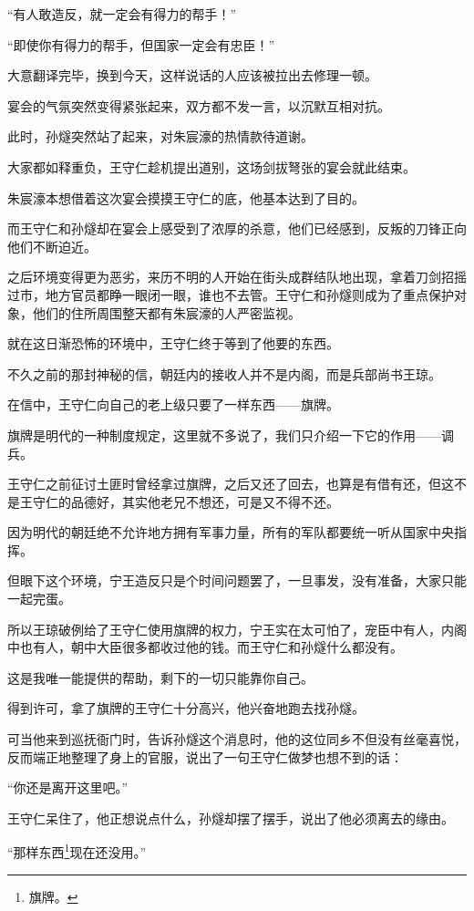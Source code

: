 \begin{multicols}{\theparacolNo}
		“有人敢造反，就一定会有得力的帮手！”

		“即使你有得力的帮手，但国家一定会有忠臣！”

		大意翻译完毕，换到今天，这样说话的人应该被拉出去修理一顿。

		宴会的气氛突然变得紧张起来，双方都不发一言，以沉默互相对抗。

		此时，孙燧突然站了起来，对朱宸濠的热情款待道谢。

		大家都如释重负，王守仁趁机提出道别，这场剑拔弩张的宴会就此结束。

		朱宸濠本想借着这次宴会摸摸王守仁的底，他基本达到了目的。

		而王守仁和孙燧却在宴会上感受到了浓厚的杀意，他们已经感到，反叛的刀锋正向他们不断迫近。

		之后环境变得更为恶劣，来历不明的人开始在街头成群结队地出现，拿着刀剑招摇过市，地方官员都睁一眼闭一眼，谁也不去管。王守仁和孙燧则成为了重点保护对象，他们的住所周围整天都有朱宸濠的人严密监视。

		就在这日渐恐怖的环境中，王守仁终于等到了他要的东西。

		不久之前的那封神秘的信，朝廷内的接收人并不是内阁，而是兵部尚书王琼。

		在信中，王守仁向自己的老上级只要了一样东西——旗牌。

		旗牌是明代的一种制度规定，这里就不多说了，我们只介绍一下它的作用——调兵。

		王守仁之前征讨土匪时曾经拿过旗牌，之后又还了回去，也算是有借有还，但这不是王守仁的品德好，其实他老兄不想还，可是又不得不还。

		因为明代的朝廷绝不允许地方拥有军事力量，所有的军队都要统一听从国家中央指挥。

		但眼下这个环境，宁王造反只是个时间问题罢了，一旦事发，没有准备，大家只能一起完蛋。

		所以王琼破例给了王守仁使用旗牌的权力，宁王实在太可怕了，宠臣中有人，内阁中也有人，朝中大臣很多都收过他的钱。而王守仁和孙燧什么都没有。

		这是我唯一能提供的帮助，剩下的一切只能靠你自己。

		得到许可，拿了旗牌的王守仁十分高兴，他兴奋地跑去找孙燧。

		可当他来到巡抚衙门时，告诉孙燧这个消息时，他的这位同乡不但没有丝毫喜悦，反而端正地整理了身上的官服，说出了一句王守仁做梦也想不到的话：

		“你还是离开这里吧。”

		王守仁呆住了，他正想说点什么，孙燧却摆了摆手，说出了他必须离去的缘由。

		“那样东西\footnote{旗牌。}现在还没用。”


\end{multicols}

